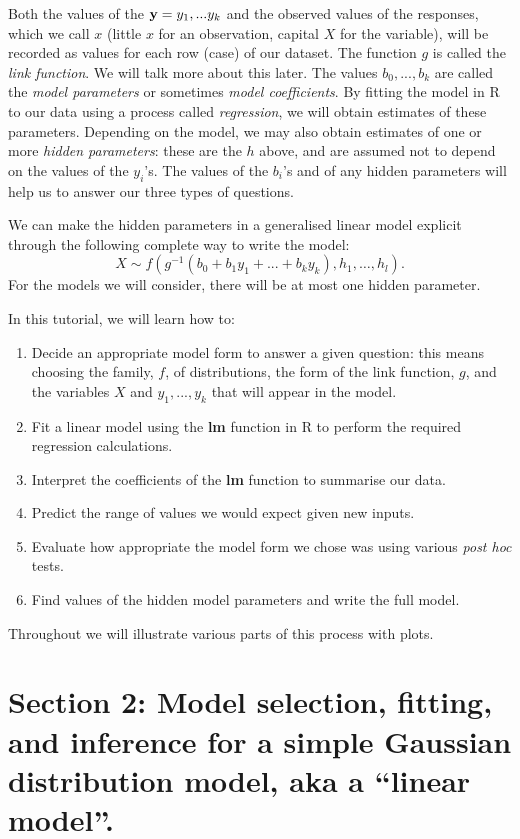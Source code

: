 \documentclass[
]{article}
\begin{document}
Both the values of the \({\bf y} = y_1, ... y_k\) and the observed
values of the responses, which we call \(x\) (little \(x\) for an
observation, capital \(X\) for the variable), will be recorded as values
for each row (case) of our dataset. The function \(g\) is called the
\emph{link function}. We will talk more about this later. The values
\(b_0, ..., b_k\) are called the \emph{model parameters} or sometimes
\emph{model coefficients}. By fitting the model in R to our data using a
process called \emph{regression}, we will obtain estimates of these
parameters. Depending on the model, we may also obtain estimates of one
or more \emph{hidden parameters}: these are the \(h\) above, and are
assumed not to depend on the values of the \(y_i\)'s. The values of the
\(b_i\)'s and of any hidden parameters will help us to answer our three
types of questions.

We can make the hidden parameters in a generalised linear model explicit
through the following complete way to write the model: \[
X \sim f(g^{-1}(b_0 +b_1 y_1 + ... + b_k y_k),h_1,\ldots,h_l).
\] For the models we will consider, there will be at most one hidden
parameter.

In this tutorial, we will learn how to:

\begin{enumerate}
\def\labelenumi{\arabic{enumi}.}
\item
  Decide an appropriate model form to answer a given question: this
  means choosing the family, \(f\), of distributions, the form of the
  link function, \(g\), and the variables \(X\) and \(y_1,...,y_k\) that
  will appear in the model.
\item
  Fit a linear model using the \textbf{lm} function in R to perform the
  required regression calculations.
\item
  Interpret the coefficients of the \textbf{lm} function to summarise
  our data.
\item
  Predict the range of values we would expect given new inputs.
\item
  Evaluate how appropriate the model form we chose was using various
  \emph{post hoc} tests.
\item
  Find values of the hidden model parameters and write the full model.
\end{enumerate}

Throughout we will illustrate various parts of this process with plots.

\hypertarget{section-2-model-selection-fitting-and-inference-for-a-simple-gaussian-distribution-model-aka-a-linear-model.}{%
\section{Section 2: Model selection, fitting, and inference for a simple
Gaussian distribution model, aka a ``linear
model''.}\label{section-2-model-selection-fitting-and-inference-for-a-simple-gaussian-distribution-model-aka-a-linear-model.}}
\end{document}
